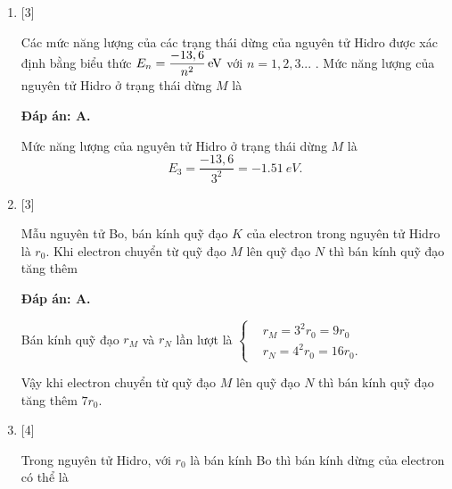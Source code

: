 \begin{enumerate}[label=\bfseries Câu \arabic*:]
		\item {} [3]
	
		\cauhoi
		{Các mức năng lượng của các trạng thái dừng của nguyên tử Hidro được xác định bằng biểu thức $ E_{n} = \xsi{\dfrac{-13,6}{n^{2}}}{eV} $ với $ n = 1,2,3... $ . Mức năng lượng của nguyên tử Hidro ở trạng thái dừng $ M $ là
		}
	
		\loigiai
		{		\textbf{Đáp án: A.}

Mức năng lượng của nguyên tử Hidro ở trạng thái dừng $ M $ là
$$
	E_{3} = \dfrac{-13,6}{3^{2}} = \SI{-1,51}{eV}.
$$
		}
		
		\item {} [3]
	
		\cauhoi
		{Mẫu nguyên tử Bo, bán kính quỹ đạo $ K $ của electron trong nguyên tử Hidro là $ r_{0} $. Khi electron chuyển từ quỹ đạo $ M $ lên quỹ đạo $ N $ thì bán kính quỹ đạo tăng thêm
		}
	
		\loigiai
		{		\textbf{Đáp án: A.}

Bán kính quỹ đạo $ r_{M} $ và $ r_{N} $ lần lượt là
$
	\left\{
		\begin{aligned}
			& r_{M} = 3^{2} r_{0} = 9 r_{0} \\
			& r_{N} = 4^{2} r_{0} = 16 r_{0}.
		\end{aligned}
	\right.
$

Vậy khi electron chuyển từ quỹ đạo $ M $ lên quỹ đạo $ N $ thì bán kính quỹ đạo tăng thêm $ 7 r_{0} $.
		}
		
		\item {} [4]
	
		\cauhoi
		{Trong nguyên tử Hidro, với $ r_{0} $ là bán kính Bo thì bán kính dừng của electron có thể là
		}
	

\end{enumerate}

